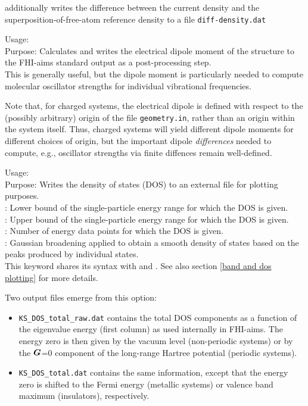   additionally writes the
difference between the current density and the
superposition-of-free-atom reference density to a file \texttt{diff-density.dat}

{
  \noindent
  Usage:   \\[1.0ex]
  Purpose: Calculates and writes the electrical dipole moment of the
    structure to the FHI-aims standard output as a post-processing step. \\[1.0ex]
}
This is generally useful, but the dipole moment is particularly needed
to compute molecular oscillator strengths for individual vibrational
frequencies.

Note that, for charged systems, the electrical dipole is defined with
respect to the (possibly arbitrary) origin of the file
\texttt{geometry.in}, rather than an origin within the system
itself. Thus, charged systems will yield different dipole moments
for different choices of origin, but the important dipole
\emph{differences} needed to compute, e.g., oscillator strengths via
finite diffences remain well-defined.

{
  Usage:    \\[1.0ex]
  Purpose: Writes the density of states (DOS) to an external file for
    plotting purposes.\\[1.0ex]
   : Lower bound of the single-particle energy range
    for which the DOS is given. \\
   : Upper bound of the single-particle energy range
    for which the DOS is given. \\
   : Number of energy data points for which the
    DOS is given. \\
   : Gaussian broadening applied to obtain a smooth
    density of states based on the peaks produced by
    individual states. \\
}
This keyword shares its syntax with 
 and 
. See also section \ref{band
  and dos plotting} for more details.

Two output files emerge from this option:
\begin{itemize}
  \item \texttt{KS\_DOS\_total\_raw.dat} contains the total DOS components as
    a function of the eigenvalue energy (first column) as used internally in
    FHI-aims. The energy zero is then given by the vacuum level (non-periodic
    systems) or by the $\mbox{\boldmath$G$}$=0 component of the long-range Hartree
    potential (periodic systems).
  \item \texttt{KS\_DOS\_total.dat} contains the same
    information, except that the energy zero is shifted to the Fermi energy
    (metallic systems) or valence band maximum (insulators), respectively.
\end{itemize}

